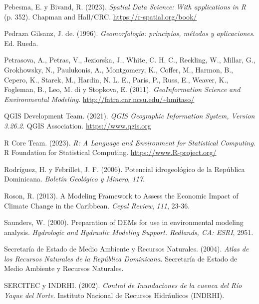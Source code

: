 \documentclass[spanish]{article}
\newlength{\cslhangindent}
\newlength{\cslentryspacingunit} %
\newenvironment{CSLReferences}[2] %
 {%
  \setlength{\parindent}{0pt}
  \ifodd #1
  \let\oldpar\par
  \def\par{\hangindent=\cslhangindent\oldpar}
  \fi
  \setlength{\parskip}{#2\cslentryspacingunit}
 }%
 {}
\begin{document}
\begin{CSLReferences}{1}{0}
\leavevmode{}%
Pebesma, E. y Bivand, R. (2023). \emph{{Spatial Data Science: With
applications in R}} (p. 352). {Chapman and Hall/CRC}.
\url{https://r-spatial.org/book/}

\leavevmode{}%
Pedraza Gilsanz, J. de. (1996). \emph{Geomorfología: principios, métodos
y aplicaciones}. Ed. Rueda.

\leavevmode{}%
Petrasova, A., Petras, V., Jeziorska, J., White, C. H. C., Reckling, W.,
Millar, G., Grokhowsky, N., Paulukonis, A., Montgomery, K., Coffer, M.,
Harmon, B., Cepero, K., Starek, M., Hardin, N. L. E., Paris, P., Russ,
E., Weaver, K., Fogleman, B., Leo, M. di y Stopkova, E. (2011).
\emph{GeoInformation Science and Environmental Modeling}.
\url{http://fatra.cnr.ncsu.edu/~hmitaso/}

\leavevmode{}%
QGIS Development Team. (2021). \emph{QGIS Geographic Information System,
Version 3.26.2}. QGIS Association. \url{https://www.qgis.org}

\leavevmode{}%
R Core Team. (2023). \emph{R: A Language and Environment for Statistical
Computing}. R Foundation for Statistical Computing.
\url{https://www.R-project.org/}

\leavevmode{}%
Rodríguez, H. y Febrillet, J. F. (2006). {Potencial idrogeológico de la
República Dominicana}. \emph{Boletín Geológico y Minero}, \emph{117}.

\leavevmode{}%
Roson, R. (2013). A Modeling Framework to Assess the Economic Impact of
Climate Change in the Caribbean. \emph{Cepal Review}, \emph{111}, 23-36.

\leavevmode{}%
Saunders, W. (2000). Preparation of DEMs for use in environmental
modeling analysis. \emph{Hydrologic and Hydraulic Modeling Support.
Redlands, CA: ESRI}, 2951.

\leavevmode{}%
Secretaría de Estado de Medio Ambiente y Recursos Naturales. (2004).
\emph{{Atlas de los Recursos Naturales de la República Dominicana}}.
{Secretaría de Estado de Medio Ambiente y Recursos Naturales}.

\leavevmode{}%
SERCITEC y INDRHI. (2002). \emph{{Control de Inundaciones de la cuenca
del Río Yaque del Norte}}. {Instituto Nacional de Recursos Hidráulicos
(INDRHI)}.


\end{CSLReferences}
\end{document}
